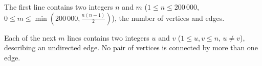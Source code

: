The first line contains two integers $n$ and $m$ ($1 \le n \le 200\,000$, $0 \le m \le \min(200\,000,\frac{n(n-1)}2)$), the number of vertices and edges.

Each of the next $m$ lines contains two integers $u$ and $v$ ($1 \le u,v \le n$, $u \ne v$), describing an undirected edge. No pair of vertices is connected by more than one edge.
